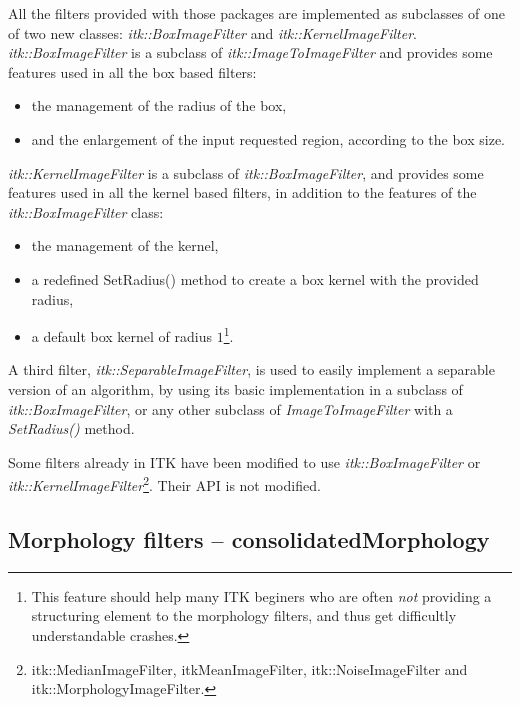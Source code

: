 \documentclass{InsightArticle}
\begin{document}
All the filters provided with those packages are implemented as subclasses
of one of two new classes: {\em itk::BoxImageFilter} and {\em itk::KernelImageFilter}.
{\em itk::BoxImageFilter} is a subclass of {\em itk::ImageToImageFilter} and provides
some features used in all the box based filters:
\begin{itemize}
  \item the management of the radius of the box,
  \item and the enlargement of the input requested region, according to the box size.
\end{itemize}
{\em itk::KernelImageFilter} is a subclass of {\em itk::BoxImageFilter}, and provides
some features used in all the kernel based filters, in addition to the features of the
{\em itk::BoxImageFilter} class:
\begin{itemize}
  \item the management of the kernel,
  \item a redefined SetRadius() method to create a box kernel with the provided radius,
  \item a default box kernel of radius $1$\footnote{This feature should help many ITK
beginers who are often {\em not} providing a structuring element to the morphology filters,
and thus get difficultly understandable crashes.}.
\end{itemize}

A third filter, {\em itk::SeparableImageFilter}, is used to easily implement a separable
version of an algorithm, by using its basic implementation in a subclass of
{\em itk::BoxImageFilter}, or any other subclass of {\em ImageToImageFilter} with
a {\em SetRadius()} method.

Some filters already in ITK have been modified to use {\em itk::BoxImageFilter} or
{\em itk::KernelImageFilter}\footnote{itk::MedianImageFilter, itkMeanImageFilter,
itk::NoiseImageFilter and itk::MorphologyImageFilter.}. Their API is not modified.

\subsection{Morphology filters -- consolidatedMorphology}
\end{document}
